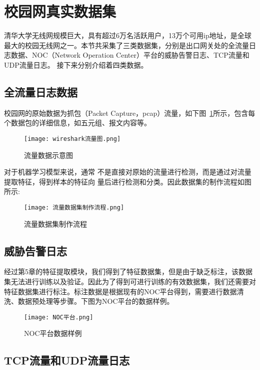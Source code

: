 \section{校园网真实数据集}
清华大学无线网规模巨大，具有超过6万名活跃用户，13万个可用ip地址，是全球最大的校园无线网之一。本节共采集了三类数据集，分别是出口网关处的全流量日志数据、NOC（Network Operation Center）平台的威胁告警日志、TCP流量和UDP流量日志。
接下来分别介绍着四类数据。

\subsection{全流量日志数据}
校园网的原始数据为抓包（Packet Capture，pcap）流量，如下图~\ref{fig:wireshark}所示，包含每个数据包的详细信息，如五元组、报文内容等。

\begin{figure}
    \centering
    \texttt{[image: wireshark流量图.png]}
    \caption{流量数据示意图}
    \label{fig:wireshark}
  \end{figure}

  对于机器学习模型来说，通常
  不是直接对原始的流量进行检测，而是通过对流量提取特征，得到样本的特征向
  量后进行检测和分类。因此数据集的制作流程如图所示:
  \begin{figure}
    \centering
    \texttt{[image: 流量数据集制作流程.png]}
    \caption{流量数据集制作流程}
    \label{fig:flow}
  \end{figure}

\subsection{威胁告警日志}
经过第5章的特征提取模块，我们得到了特征数据集，但是由于缺乏标注，该数据集无法进行训练以及验证。因此为了得到可进行训练的有效数据集，我们还需要对特征数据集进行标注。标注数据是根据现有的NOC平台得到，需要进行数据清洗、数据预处理等步骤。下图为NOC平台的数据样例。
\begin{figure}
    \centering
    \texttt{[image: NOC平台.png]}
    \caption{NOC平台数据样例}
    \label{fig:NOC}
  \end{figure}
\subsection{TCP流量和UDP流量日志}


